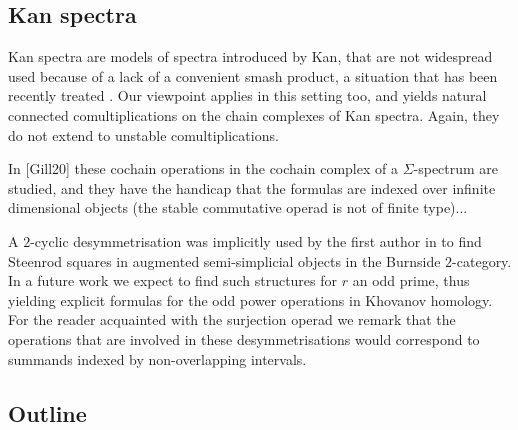 

\subsection{Kan spectra}

Kan spectra \cite{Kan1963} are models of spectra introduced by Kan, that are not widespread used because of a lack of a convenient smash product, a situation that has been recently treated \cite{CKP2023}.
Our viewpoint applies in this setting too, and yields natural connected comultiplications on the chain complexes of Kan spectra.
Again, they do not extend to unstable comultiplications.

In [Gill20] these cochain operations in the cochain complex of a $\Sigma$-spectrum are studied, and they have the handicap that the formulas are indexed over infinite dimensional objects (the stable commutative operad is not of finite type)...

A $2$-cyclic desymmetrisation was implicitly used by the first author in \cite{cantero-moran2020khovanov} to find Steenrod squares in augmented semi-simplicial objects in the Burnside $2$-category.
In a future work we expect to find such structures for $r$ an odd prime, thus yielding explicit formulas for the odd power operations in Khovanov homology.
For the reader acquainted with the surjection operad we remark that the operations that are involved in these desymmetrisations would correspond to summands indexed by non-overlapping intervals.

\subsection{Outline}

